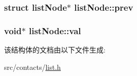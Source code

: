 \subsubsection[{\texorpdfstring{prev}{prev}}]{\setlength{\rightskip}{0pt plus 5cm}struct {\bf list\+Node}$\ast$ list\+Node\+::prev}\hypertarget{structlistNode_a79259218e5b958028b7e650d48d3cb01}{}\label{structlistNode_a79259218e5b958028b7e650d48d3cb01}
\subsubsection[{\texorpdfstring{val}{val}}]{\setlength{\rightskip}{0pt plus 5cm}void$\ast$ list\+Node\+::val}\hypertarget{structlistNode_adb310bc734d6abb046a3b72b9ca9b684}{}\label{structlistNode_adb310bc734d6abb046a3b72b9ca9b684}


该结构体的文档由以下文件生成\+:\begin{DoxyCompactItemize}
\item 
src/contacts/\hyperlink{list_8h}{list.\+h}\end{DoxyCompactItemize}
